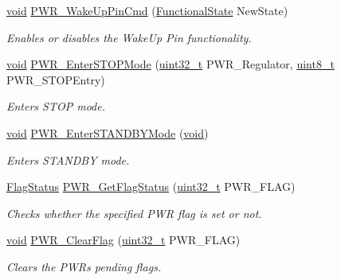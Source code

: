 \begin{DoxyCompactItemize}
\hyperlink{usb__devapi_8h_afabf60e7f57651d6d595a02c75f07cd0}{void} \hyperlink{group___p_w_r___exported___functions_gae5fd6f9336ef8c60d5483651cb0d1a00}{P\+W\+R\+\_\+\+Wake\+Up\+Pin\+Cmd} (\hyperlink{agilefox_2library_2inc_2stm32f10x__type_8h_ac9a7e9a35d2513ec15c3b537aaa4fba1}{Functional\+State} New\+State)
\begin{DoxyCompactList}\small\item\em Enables or disables the Wake\+Up Pin functionality. \end{DoxyCompactList}\item 
\hyperlink{usb__devapi_8h_afabf60e7f57651d6d595a02c75f07cd0}{void} \hyperlink{group___p_w_r___exported___functions_ga694676ac06a9baf50eae45adae0118ab}{P\+W\+R\+\_\+\+Enter\+S\+T\+O\+P\+Mode} (\hyperlink{_p_e___types_8h_a33594304e786b158f3fb30289278f5af}{uint32\+\_\+t} P\+W\+R\+\_\+\+Regulator, \hyperlink{_p_e___types_8h_aba7bc1797add20fe3efdf37ced1182c5}{uint8\+\_\+t} P\+W\+R\+\_\+\+S\+T\+O\+P\+Entry)
\begin{DoxyCompactList}\small\item\em Enters S\+T\+OP mode. \end{DoxyCompactList}\item 
\hyperlink{usb__devapi_8h_afabf60e7f57651d6d595a02c75f07cd0}{void} \hyperlink{group___p_w_r___exported___functions_ga00ddae00a9c327b81b24d2597b0052f3}{P\+W\+R\+\_\+\+Enter\+S\+T\+A\+N\+D\+B\+Y\+Mode} (\hyperlink{usb__devapi_8h_afabf60e7f57651d6d595a02c75f07cd0}{void})
\begin{DoxyCompactList}\small\item\em Enters S\+T\+A\+N\+D\+BY mode. \end{DoxyCompactList}\item 
\hyperlink{agilefox_2library_2inc_2stm32f10x__type_8h_a89136caac2e14c55151f527ac02daaff}{Flag\+Status} \hyperlink{group___p_w_r___exported___functions_gaa980163a4d83304280ee34942464b4ec}{P\+W\+R\+\_\+\+Get\+Flag\+Status} (\hyperlink{_p_e___types_8h_a33594304e786b158f3fb30289278f5af}{uint32\+\_\+t} P\+W\+R\+\_\+\+F\+L\+AG)
\begin{DoxyCompactList}\small\item\em Checks whether the specified P\+WR flag is set or not. \end{DoxyCompactList}\item 
\hyperlink{usb__devapi_8h_afabf60e7f57651d6d595a02c75f07cd0}{void} \hyperlink{group___p_w_r___exported___functions_ga01c4b2fbd16514b993324e101c3ddf7c}{P\+W\+R\+\_\+\+Clear\+Flag} (\hyperlink{_p_e___types_8h_a33594304e786b158f3fb30289278f5af}{uint32\+\_\+t} P\+W\+R\+\_\+\+F\+L\+AG)
\begin{DoxyCompactList}\small\item\em Clears the P\+WR\textquotesingle{}s pending flags. \end{DoxyCompactList}\end{DoxyCompactItemize}
